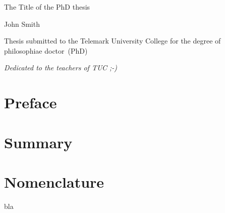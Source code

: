 \documentclass[11pt,a4paper,openright]{book} %
\begin{document}
\frontmatter  %
\begin{titlepage}
  \begin{center}
    \LARGE{The Title of the PhD thesis}
  \end{center}
  \begin{center}
    \Large{John Smith}
  \end{center}
  \begin{center}
    \large{Thesis submitted to the Telemark University College for the degree of philosophiae doctor~(PhD)}
  \end{center}
\end{titlepage}\cleardoublepage

\begin{flushright}
\large{\emph{Dedicated to the teachers of TUC ;-)}}

\end{flushright}



\chapter*{Preface}
\label{sec:preface}
\lipsum[1-3]

\chapter*{Summary}
\label{sec:summary}
\lipsum[1-3]

\tableofcontents

\chapter*{Nomenclature}
\label{sec:summary}
bla
\end{document}
